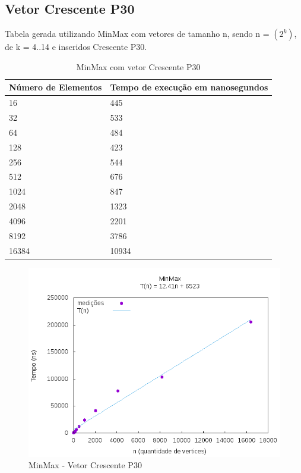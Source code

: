 \documentclass[12pt,a4paper,twoside]{report}
\begin{document}
\subsection{Vetor Crescente P30}
Tabela gerada utilizando MinMax com vetores de tamanho n, sendo n = $(2^k)$, de k = 4..14 e inseridos Crescente P30.
\begin{table}[H]
\centering
\caption{MinMax com vetor Crescente P30}
\label{my-label}
\begin{tabular}{|l|l|}
\hline
\multicolumn{1}{|c|}{\textbf{Número de Elementos}} & \multicolumn{1}{c|}{\textbf{Tempo de execução em nanosegundos}} \\ \hline
16 & 445 \\ \hline
32 & 533 \\ \hline
64 & 484 \\ \hline
128 & 423 \\ \hline
256 & 544 \\ \hline
512 & 676 \\ \hline
1024 & 847 \\ \hline
2048 & 1323 \\ \hline
4096 & 2201 \\ \hline
8192 & 3786 \\ \hline
16384 & 10934 \\ \hline
\end{tabular}
\end{table}

\begin{figure}[H]
    \centering
    \includegraphics[width=0.7\linewidth]{graficos/Min Max/Crescente P30/MinMax.png}
  \caption{MinMax - Vetor Crescente P30}
\end{figure}
\end{document}
